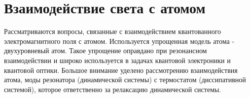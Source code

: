 \chapter{Взаимодействие света с атомом}
\label{chInteraction}

Рассматриваются вопросы, связанные с взаимодействием квантованного
электромагнитного поля с атомом. Используется упрощенная модель атома -
двухуровневый атом. Такое упрощение оправдано при резонансном
взаимодействии и широко используется в задачах квантовой электроники и
квантовой оптики. Большое внимание уделено рассмотрению
взаимодействия атома, моды резонатора (динамической системы) с
термостатом (диссипативной системой), которое ответственно за
релаксацию динамической системы.  
















